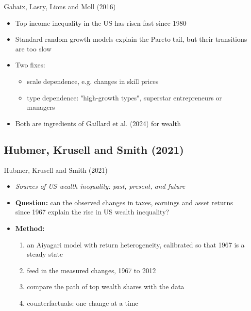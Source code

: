 \documentclass[10pt,english,10pt,handout]{beamer}
\begin{document}
\begin{frame}{Gabaix, Lasry, Lions and Moll (2016)}
\begin{itemize}
\item Top income inequality in the US has risen fast since 1980
\item Standard random growth models explain the Pareto tail, but their transitions are too slow
\item Two fixes:
\begin{itemize}
\item scale dependence, e.g. changes in skill prices
\item type dependence: "high-growth types", superstar entrepreneurs or managers
\end{itemize}
\item Both are ingredients of Gaillard et al. (2024) for wealth
\end{itemize}
\end{frame}

\subsection{Hubmer, Krusell and Smith (2021)}

\begin{frame}{Hubmer, Krusell and Smith (2021)}
\begin{itemize}
\item \emph{Sources of US wealth inequality: past, present, and future}
\item \textbf{Question:} can the observed changes in taxes, earnings and asset returns since 1967 explain the rise in US wealth inequality?
\item \textbf{Method:}
\begin{enumerate}
\item an Aiyagari model with return heterogeneity, calibrated so that 1967 is a steady state
\item feed in the measured changes, 1967 to 2012
\item compare the path of top wealth shares with the data
\item counterfactuals: one change at a time
\end{enumerate}
\end{itemize}
\end{frame}
\end{document}

